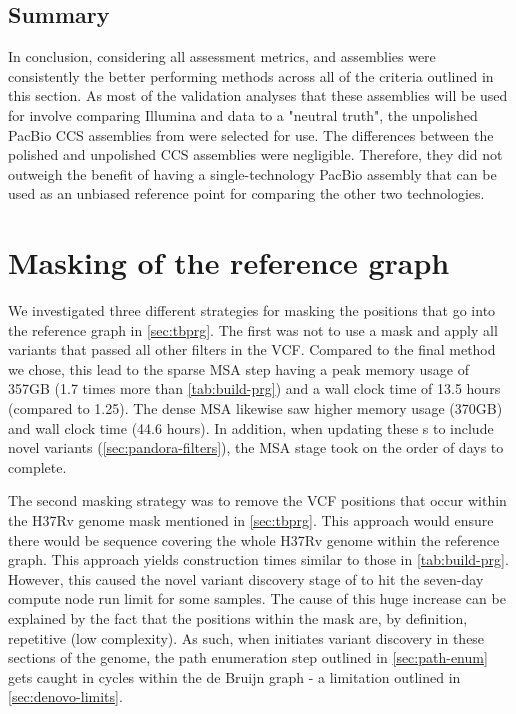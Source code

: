 \subsection{Summary}

In conclusion, considering all assessment metrics,  and  assemblies were consistently the better performing methods across all of the criteria outlined in this section. As most of the validation analyses that these assemblies will be used for involve comparing Illumina and \ont{} data to a "neutral truth", the unpolished PacBio CCS assemblies from  were selected for use. The differences between the polished and unpolished CCS assemblies were negligible. Therefore, they did not outweigh the benefit of having a single-technology PacBio assembly that can be used as an unbiased reference point for comparing the other two technologies.


\section{Masking of the \mtb{} reference graph}
\label{app:mask}

We investigated three different strategies for masking the positions that go into the \mtb{} reference graph in \autoref{sec:tbprg}. The first was not to use a mask and apply all variants that passed all other filters in the \cryptic{} VCF. Compared to the final method we chose, this lead to the sparse \prg{} MSA step having a peak memory usage of 357GB (1.7 times more than \autoref{tab:build-prg}) and a wall clock time of 13.5 hours (compared to 1.25). The dense \prg{} MSA likewise saw higher memory usage (370GB) and wall clock time (44.6 hours). In addition, when updating these \prg{}s to include novel variants (\autoref{sec:pandora-filters}), the MSA stage took on the order of days to complete.

The second masking strategy was to remove the VCF positions that occur within the H37Rv genome mask mentioned in \autoref{sec:tbprg}. This approach would ensure there would be sequence covering the whole H37Rv genome within the reference graph. This approach yields construction times similar to those in \autoref{tab:build-prg}. However, this caused the novel variant discovery stage of \pandora{} to hit the seven-day compute node run limit for some samples. The cause of this huge increase can be explained by the fact that the positions within the mask are, by definition, repetitive (low complexity). As such, when \pandora{} initiates \denovo{} variant discovery in these sections of the genome, the path enumeration step outlined in \autoref{sec:path-enum} gets caught in cycles within the de Bruijn graph - a limitation outlined in \autoref{sec:denovo-limits}.

